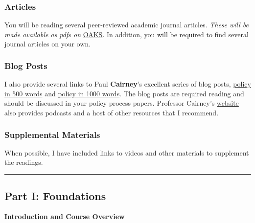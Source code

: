 \hypertarget{articles}{%
\subsubsection{Articles}\label{articles}}

\faFileTextO \hspace{0.005in} You will be reading several peer-reviewed
academic journal articles. \emph{These will be made available as pdfs
on} \href{https://lms.cofc.edu}{OAKS}. In addition, you will be required
to find several journal articles on your own.

\hypertarget{blog-posts}{%
\subsubsection{Blog Posts}\label{blog-posts}}

\faExternalLink \hspace{0.005in} I also provide several links to Paul
\textbf{Cairney}'s excellent series of blog posts,
\href{https://paulcairney.wordpress.com/500-words/}{policy in 500 words}
and \href{https://paulcairney.wordpress.com/1000-words/}{policy in 1000
words}. The blog posts are required reading and should be discussed in
your policy process papers. Professor Cairney's
\href{https://paulcairney.wordpress.com/}{website} also provides
podcasts and a host of other resources that I recommend.

\hypertarget{supplemental-materials}{%
\subsubsection{Supplemental Materials}\label{supplemental-materials}}

\faYoutube \hspace{0.005in} When possible, I have included links to
videos and other materials to supplement the readings.

\begin{center}\rule{0.5\linewidth}{0.5pt}\end{center}

\SetDate[23/08/2021]

\hypertarget{part-i-foundations}{%
\subsection{Part I: Foundations}\label{part-i-foundations}}

\week \textbf{Introduction and Course Overview}

